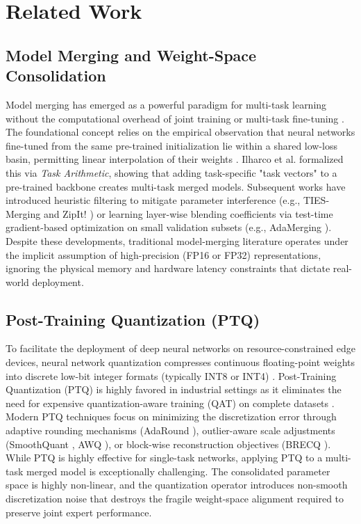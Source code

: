 \section{Related Work}
\label{submission:sec:related}

\subsection{Model Merging and Weight-Space Consolidation}
Model merging has emerged as a powerful paradigm for multi-task learning without the computational overhead of joint training or multi-task fine-tuning \cite{wortsman2022model, choshen2022fusing}. The foundational concept relies on the empirical observation that neural networks fine-tuned from the same pre-trained initialization lie within a shared low-loss basin, permitting linear interpolation of their weights \cite{ainsworth2022git, wortsman2022model}. Ilharco et al. \cite{ilharco2022editing} formalized this via \emph{Task Arithmetic}, showing that adding task-specific "task vectors" to a pre-trained backbone creates multi-task merged models. Subsequent works have introduced heuristic filtering to mitigate parameter interference (e.g., TIES-Merging \cite{yadav2023ties} and ZipIt! \cite{stoica2023zipit}) or learning layer-wise blending coefficients via test-time gradient-based optimization on small validation subsets (e.g., AdaMerging \cite{yang2023adamerging}). Despite these developments, traditional model-merging literature operates under the implicit assumption of high-precision (FP16 or FP32) representations, ignoring the physical memory and hardware latency constraints that dictate real-world deployment.

\subsection{Post-Training Quantization (PTQ)}
To facilitate the deployment of deep neural networks on resource-constrained edge devices, neural network quantization compresses continuous floating-point weights into discrete low-bit integer formats (typically INT8 or INT4) \cite{nagel2021whitepaper, gholami2021survey}. Post-Training Quantization (PTQ) is highly favored in industrial settings as it eliminates the need for expensive quantization-aware training (QAT) on complete datasets \cite{krishnamoorthi2018quantizing}. Modern PTQ techniques focus on minimizing the discretization error through adaptive rounding mechanisms (AdaRound \cite{nagel2020adaround}), outlier-aware scale adjustments (SmoothQuant \cite{xiao2023smoothquant}, AWQ \cite{lin2023awq}), or block-wise reconstruction objectives (BRECQ \cite{li2021brecq}). While PTQ is highly effective for single-task networks, applying PTQ to a multi-task merged model is exceptionally challenging. The consolidated parameter space is highly non-linear, and the quantization operator introduces non-smooth discretization noise that destroys the fragile weight-space alignment required to preserve joint expert performance.

